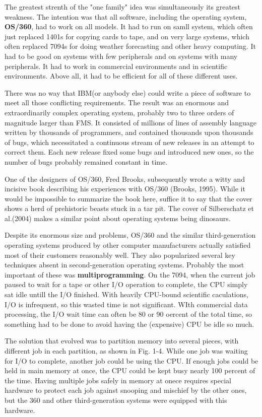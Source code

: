 \documentclass{book}
\newcommand {\kw}  [1] {\textbf{#1}}
\begin{document}
The greatest strenth of the "one family" idea was simultaneously its greatest weakness.
The intention was that all software, including the operating system, \kw{OS/360}, had to work on all models.
It had to run on samll system, which often just replaced 1401s for copying cards to tape, 
and on very large systems, which often replaced 7094s for doing weather forecasting and other heavy computing.
It had to be good on systems with few peripherals and on systems with many peripherals.
It had to work in commercial environments and in scientific environments.
Above all, it had to be efficient for all of these different uses.

There was no way that IBM(or anybody else) could write a piece of software to meet all those conflicting requirements.
The result was an enormous and extraordinarily complex operating system, probably two to three orders of magnitude larger than FMS.
It consisted of millions of lines of assembly language written by thousands of programmers, 
and contained thousands upon thousands of bugs, which necessitated a continuous stream of new releases in an attempt to correct them.
Each new release fixed some bugs and introduced new ones, so the number of bugs probably remained constant in time.

One of the designers of OS/360, Fred Brooks, subsequently wrote a witty and incisive book describing his experiences with OS/360 (Brooks, 1995).
While it would be impossible to summarize the book here, suffice it to say that the cover shows a herd of prehistoric beasts stuck in a tar pit.
The cover of Silberschatz et al.(2004) makes a similar point about operating systems being dinosaurs.

Despite its enormous size and problems, OS/360 and the similar third-generation operating systems produced by other computer manufacturers 
actually satisfied most of their customers reasonably well.
They also popularized several key techniques absent in second-generation operating systems.
Probably the most important of these was \kw{multiprogramming}.
On the 7094, when the current job paused to wait for a tape or other I/O operation to complete, the CPU simply sat idle untill the I/O finished.
With heavily CPU-bound scientific caculations, I/O is infrequent, so this wasted time is not significant.
WIth commercial data processing, the I/O wait time can often be 80 or 90 oercent of the total time, 
so something had to be done to avoid having the (expensive) CPU be idle so much.

The solution that evolved was to partition memory into several pieces, with different job in each partition, as shown in Fig. 1-4.
While one job was waiting for I/O to complete, another job could be using the CPU.
If enough jobs could be held in main memory at once, the CPU could be kept busy nearly 100 percent of the time.
Having multiple jobs safely in memory at onece requires special hardware to protect each job against snooping and mischief by the other ones,
but the 360 and other third-generation systems were equipped with this hardware.
\end{document}
